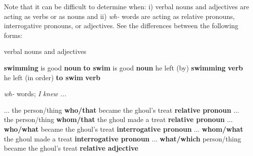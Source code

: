 \documentclass[12pt]{article}
\begin{document}
\noindent Note that it can be difficult to determine when: i) verbal nouns and adjectives are acting as verbs or as nouns and ii) \textit{wh-} words are acting as relative pronouns, interrogative pronouns, or adjectives. See the differences between the following forms:
\begin{exe}
\ex verbal nouns and adjectives
    \begin{xlist}
    \ex \textbf{swimming} is good \hfill \textbf{noun}
    \ex \textbf{to swim} is good \hfill \textbf{noun}
    \ex he left (by) \textbf{swimming} \hfill \textbf{verb}
    \ex he left (in order) \textbf{to swim} \hfill \textbf{verb}
    \end{xlist}
\end{exe}
\begin{exe}
\ex \textit{wh-} words; \textit{I knew ...}
    \begin{xlist}
    \ex ... the person/thing \textbf{who/that} became the ghoul's treat \hfill \textbf{relative pronoun}
    \ex ... the person/thing \textbf{whom/that} the ghoul made a treat \hfill \textbf{relative pronoun}
    \ex ... \textbf{who/what} became the ghoul's treat \hfill \textbf{interrogative pronoun}
    \ex ... \textbf{whom/what} the ghoul made a treat \hfill \textbf{interrogative pronoun}
    \ex ... \textbf{what/which} person/thing became the ghoul's treat \hfill \textbf{relative adjective}
    \end{xlist}
\end{exe}
\end{document}
